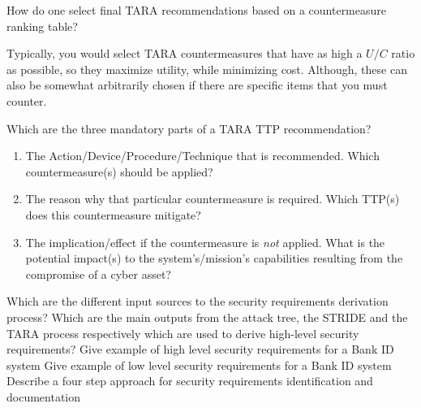 \begin{questions}
\question{} How do one select final TARA recommendations based on a countermeasure ranking table?
  \begin{solution}
    Typically, you would select TARA countermeasures that have as high a $U/C$ ratio as possible, so they maximize utility, while minimizing cost.
    Although, these can also be somewhat arbitrarily chosen if there are specific items that you must counter.
  \end{solution}

\question{} Which are the three mandatory parts of a TARA TTP recommendation?
  \begin{solution}
    \begin{enumerate}[noitemsep]
    \item The Action/Device/Procedure/Technique that is recommended.
      Which countermeasure(s) should be applied?
    \item The reason why that particular countermeasure is required.
      Which TTP(s) does this countermeasure mitigate?
    \item The implication/effect if the countermeasure is \emph{not} applied.
      What is the potential impact(s) to the system's/mission's capabilities resulting from the compromise of a cyber asset?
    \end{enumerate}
  \end{solution}

\question{} Which are the different input sources to the security requirements derivation process?
\question{} Which are the main outputs from the attack tree, the STRIDE and the TARA process respectively which are used to derive high-level security requirements?
\question{} Give example of high level security requirements for a Bank ID system
\question{} Give example of low level security requirements  for a Bank ID system
\question{} Describe a four step approach for security requirements identification and documentation
\end{questions}

